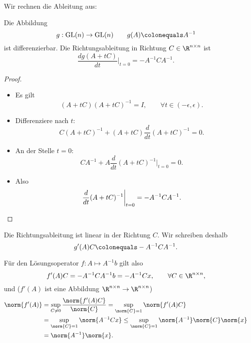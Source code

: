 Wir rechnen die Ableitung aus:
\begin{lemma}
  Die Abbildung
  \begin{equation*}
   g : \text{GL}(n) \to \text{GL}(n)
   \qquad
   g(A) \colonequals A^{-1}
  \end{equation*}
  ist differenzierbar. Die Richtungsableitung in Richtung $C\in \R^{n\times n}$ ist
\begin{equation*}
\frac{dg(A+tC)}{dt}\bigg|_{t=0} = -A^{-1}CA^{-1}.
\end{equation*}
\end{lemma}

\begin{proof}
\begin{itemize}
  \item Es gilt
   \begin{equation*}
    (A+tC)(A+tC)^{-1} = I, \qquad \forall t\in (-\epsilon,\epsilon).
   \end{equation*}
  \item Differenziere nach $t$:
  \begin{equation*}
   C(A+tC)^{-1} + (A + tC)\frac{d}{dt}(A+tC)^{-1} = 0.
  \end{equation*}
  \item An der Stelle $t = 0$:
   \begin{equation*}
    CA^{-1} + A\frac{d}{dt}(A+tC)^{-1}\bigg|_{t = 0} = 0.
   \end{equation*}
  \item Also
   \begin{equation*}
    \frac{d}{dt}(A+tC)^{-1}\bigg|_{t=0} = -A^{-1}CA^{-1}.
   \qedhere
   \end{equation*}
\end{itemize}
\end{proof}

Die Richtungsableitung ist linear in der Richtung $C$.  Wir schreiben deshalb
\begin{equation*}
 g'(A) C \colonequals -A^{-1}CA^{-1}.
\end{equation*}


\bigskip

Für den Lösungsoperator $f:A \mapsto A^{-1}b$ gilt also
\begin{equation*}
 f'(A)C = -A^{-1}CA^{-1}b = -A^{-1}Cx,
 \qquad
 \forall C\in\R^{n\times n},
\end{equation*}
und ($f'(A)$ ist eine Abbildung $\R^{n\times n}\rightarrow \R^{n\times n}$)
\begin{align*}
 \norm{f'(A)}
 &=
 \sup_{C\neq 0}\frac{\norm{f'(A)C}}{\norm{C}} = \sup_{\norm{C}=1}\norm{f'(A)C}\\
 &=
 \sup_{\norm{C}=1}\norm{A^{-1}Cx} \leq \sup_{\norm{C} =1}\norm{A^{-1}}\norm{C}\norm{x}\\
 &=
 \norm{A^{-1}}\norm{x}.
\end{align*}

